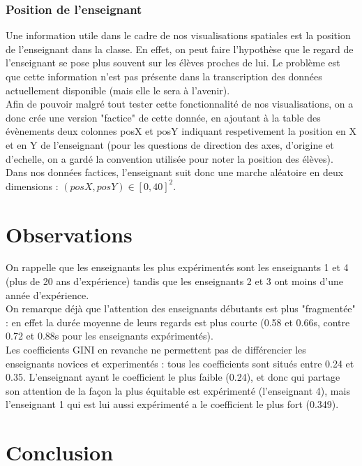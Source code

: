 \documentclass{article}
\begin{document}
\subsubsection{Position de l'enseignant}
Une information utile dans le cadre de nos visualisations spatiales est la position de l'enseignant dans la classe. En effet, on peut faire l'hypothèse que le regard de l'enseignant se pose plus souvent sur les élèves proches de lui. Le problème est que cette information n'est pas présente dans la transcription des données actuellement disponible (mais elle le sera à l'avenir).\\
Afin de pouvoir malgré tout tester cette fonctionnalité de nos visualisations, on a donc crée une version "factice" de cette donnée, en ajoutant à la table des évènements deux colonnes posX et posY indiquant respetivement la position en X et en Y de l'enseignant (pour les questions de direction des axes, d'origine et d'echelle, on a gardé la convention utilisée pour noter la position des élèves). Dans nos données factices, l'enseignant suit donc une marche aléatoire en deux dimensions : $(posX, posY) \in [0, 40]^2$.

\section{Observations}
On rappelle que les enseignants les plus expérimentés sont les enseignants 1 et 4 (plus de 20 ans d'expérience) tandis que les enseignants 2 et 3 ont moins d'une année d'expérience.\\
On remarque déjà que l'attention des enseignants débutants est plus "fragmentée" : en effet la durée moyenne de leurs regards est plus courte (0.58 et 0.66s, contre 0.72 et 0.88s pour les enseignants expérimentés).\\
Les coefficients GINI en revanche ne permettent pas de différencier les enseignants novices et experimentés : tous les coefficients sont situés entre 0.24 et 0.35. L'enseignant ayant le coefficient le plus faible (0.24), et donc qui partage son attention de la façon la plus équitable est expérimenté (l'enseignant 4), mais l'enseignant 1 qui est lui aussi expérimenté a le coefficient le plus fort (0.349).

\section{Conclusion}

{}

\end{document}
